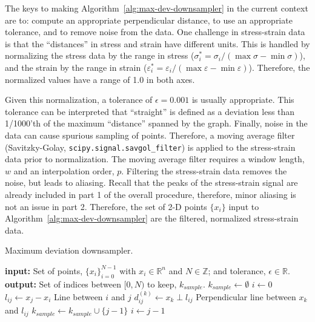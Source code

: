 \documentclass[a4paper,11pt]{article}
\begin{document}
The keys to making Algorithm~\ref{alg:max-dev-downsampler} in the current context are to: compute an appropriate perpendicular distance, to use an appropriate tolerance, and to remove noise from the data.
One challenge in stress-strain data is that the ``distances'' in stress and strain have different units.
This is handled by normalizing the stress data by the range in stress ($\sigma_i^* = \sigma_i / (\max \sigma - \min \sigma)$), and the strain by the range in strain ($\varepsilon_i^* = \varepsilon_i / (\max \varepsilon - \min \varepsilon)$).
Therefore, the normalized values have a range of 1.0 in both axes.

Given this normalization, a tolerance of $\epsilon = 0.001$ is usually appropriate.
This tolerance can be interpreted that ``straight'' is defined as a deviation less than 1/1000'th of the maximum ``distance'' spanned by the graph.
Finally, noise in the data can cause spurious sampling of points.
Therefore, a moving average filter (Savitzky-Golay, \texttt{scipy.signal.savgol\_filter}) is applied to the stress-strain data prior to normalization.
The moving average filter requires a window length, $w$ and an interpolation order, $p$.
Filtering the stress-strain data removes the noise, but leads to aliasing.
Recall that the peaks of the stress-strain signal are already included in part 1 of the overall procedure, therefore, minor aliasing is not an issue in part 2.
Therefore, the set of 2-D points $\{x_i\}$ input to Algorithm~\ref{alg:max-dev-downsampler} are the filtered, normalized stress-strain data.

\begin{algorithm}
	\caption{Maximum deviation downsampler.}
	\label{alg:max-dev-downsampler}
	\begin{algorithmic}[1]
		\State \textbf{input:} Set of points, $\{x_i\}_{i=0}^{N-1}$ with $x_i \in \mathbb{R}^n$ and $N \in \mathbb{Z}$; and tolerance, $\epsilon \in \mathbb{R}$.
        \State \textbf{output:} Set of indices between $[0, N)$ to keep, $k_{sample}$.
        \State $k_{sample} \gets \emptyset$
        \State $i \gets 0$
			\State $l_{ij} \gets x_j - x_i$
            \Comment Line between $i$ and $j$
                \State $d^{(k)}_{ij} \gets x_k \perp l_{ij}$
                \Comment Perpendicular line between $x_k$ and $l_{ij}$
            \EndFor
                \State $k_{sample} \gets k_{sample} \cup \{j - 1 \}$
                \State $i \gets j - 1$
            \EndIf
		\EndFor
\end{algorithmic}
\end{algorithm}
\end{document}
